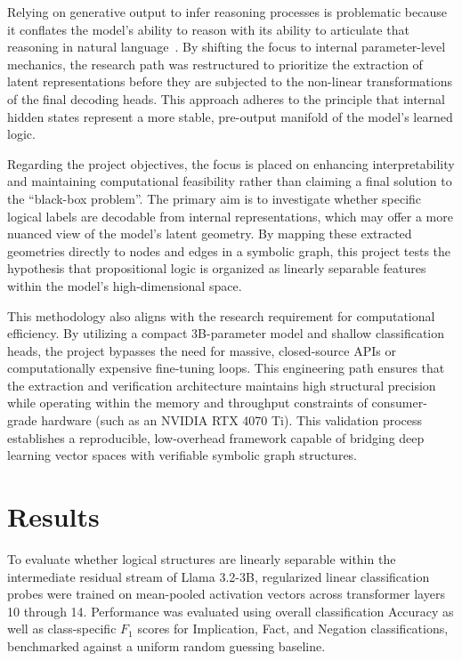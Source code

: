 \documentclass[12 pt]{article}  %
\begin{document}
Relying on generative output to infer reasoning processes is problematic because 
it conflates the model's ability to reason with its ability to articulate that 
reasoning in natural language~\cite{cheng2025empoweringllmslogicalreasoning}. 
By shifting the focus to internal parameter-level mechanics, the research path 
was restructured to prioritize the extraction of latent representations before 
they are subjected to the non-linear transformations of the final decoding heads. 
This approach adheres to the principle that internal hidden states represent a 
more stable, pre-output manifold of the model's learned logic.

Regarding the project objectives, the focus is placed on enhancing 
interpretability and maintaining computational feasibility rather than claiming 
a final solution to the ``black-box problem''. The primary aim is to investigate 
whether specific logical labels are decodable from internal representations, 
which may offer a more nuanced view of the model's latent geometry. By mapping 
these extracted geometries directly to nodes and edges in a symbolic graph, 
this project tests the hypothesis that propositional logic is organized as 
linearly separable features within the model's high-dimensional space.

This methodology also aligns with the research requirement for computational 
efficiency. By utilizing a compact 3B-parameter model and shallow classification 
heads, the project bypasses the need for massive, closed-source APIs or 
computationally expensive fine-tuning loops. This engineering path ensures that 
the extraction and verification architecture maintains high structural precision 
while operating within the memory and throughput constraints of consumer-grade 
hardware (such as an NVIDIA RTX 4070 Ti). This validation process establishes a 
reproducible, low-overhead framework capable of bridging deep learning vector 
spaces with verifiable symbolic graph structures.

\newpage
\section{Results}

To evaluate whether logical structures are linearly separable within the 
intermediate residual stream of Llama 3.2-3B, regularized linear classification 
probes were trained on mean-pooled activation vectors across transformer layers 
10 through 14. Performance was evaluated using overall classification Accuracy 
as well as class-specific $F_1$ scores for Implication, Fact, 
and Negation classifications, benchmarked against a uniform random guessing 
baseline.
\end{document}
